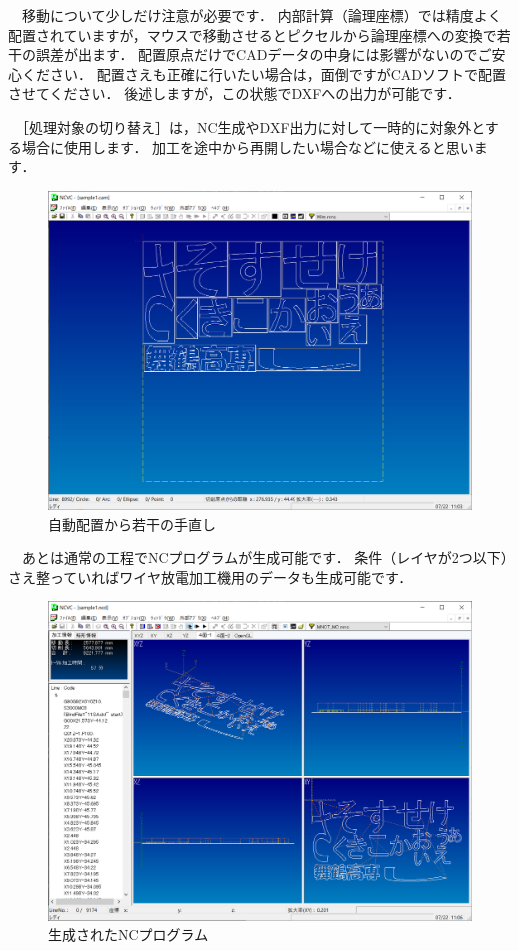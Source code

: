 　移動について少しだけ注意が必要です．
内部計算（論理座標）では精度よく配置されていますが，マウスで移動させるとピクセルから論理座標への変換で若干の誤差が出ます．
配置原点だけでCADデータの中身には影響がないのでご安心ください．
配置さえも正確に行いたい場合は，面倒ですがCADソフトで配置させてください．
後述しますが，この状態でDXFへの出力が可能です．

　［処理対象の切り替え］は，NC生成やDXF出力に対して一時的に対象外とする場合に使用します．
加工を途中から再開したい場合などに使えると思います．

\begin{figure}[H]
\centering
\includegraphics[scale=0.5]{No1/fig/sample2.png}
\caption{自動配置から若干の手直し}
\label{fig:sample2.png}
\end{figure}

　あとは通常の工程でNCプログラムが生成可能です．
条件（レイヤが2つ以下）さえ整っていればワイヤ放電加工機用のデータも生成可能です．

\begin{figure}[H]
\centering
\includegraphics[scale=0.5]{No1/fig/simu1.png}
\caption{生成されたNCプログラム}
\label{fig:simu1.png}
\end{figure}

